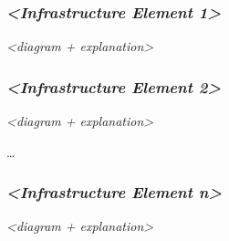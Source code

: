 \hypertarget{__emphasis_infrastructure_element_1_emphasis}{%
\subsubsection{\texorpdfstring{\emph{\textless Infrastructure Element
1\textgreater{}}}{\textless Infrastructure Element 1\textgreater{}}}\label{__emphasis_infrastructure_element_1_emphasis}}

\emph{\textless diagram + explanation\textgreater{}}

\hypertarget{__emphasis_infrastructure_element_2_emphasis}{%
\subsubsection{\texorpdfstring{\emph{\textless Infrastructure Element
2\textgreater{}}}{\textless Infrastructure Element 2\textgreater{}}}\label{__emphasis_infrastructure_element_2_emphasis}}

\emph{\textless diagram + explanation\textgreater{}}

\ldots{}

\hypertarget{__emphasis_infrastructure_element_n_emphasis}{%
\subsubsection{\texorpdfstring{\emph{\textless Infrastructure Element
n\textgreater{}}}{\textless Infrastructure Element n\textgreater{}}}\label{__emphasis_infrastructure_element_n_emphasis}}

\emph{\textless diagram + explanation\textgreater{}}
